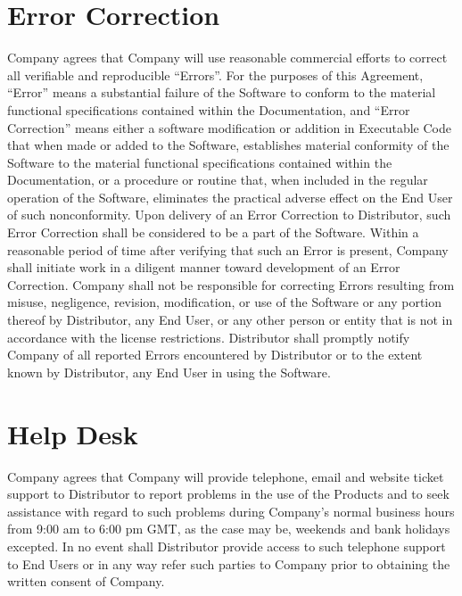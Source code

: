 \documentclass[letterpaper,10pt,english]{sphinxmanual}
\begin{document}
\section{Error Correction}
\label{\detokenize{maintenanceservice:error-correction}}
Company agrees that Company will use reasonable commercial efforts to correct all verifiable and reproducible “Errors”. For the purposes of this Agreement, “Error” means a substantial failure of the Software to conform to the material functional specifications contained within the Documentation, and “Error Correction” means either a software modification or addition in Executable Code that when made or added to the Software, establishes material conformity of the Software to the material functional specifications contained within the Documentation, or a procedure or routine that, when included in the regular operation of the Software, eliminates the practical adverse effect on the End User of such nonconformity. Upon delivery of an Error Correction to Distributor, such Error Correction shall be considered to be a part of the Software. Within a reasonable period of time after verifying that such an Error is present, Company shall initiate work in a diligent manner toward development of an Error Correction. Company shall not be responsible for correcting Errors resulting from misuse, negligence, revision, modification, or use of the Software or any portion thereof by Distributor, any End User, or any other person or entity that is not in accordance with the license restrictions.  Distributor shall promptly notify Company of all reported Errors encountered by Distributor or to the extent known by Distributor, any End User in using the Software.


\section{Help Desk}
\label{\detokenize{maintenanceservice:help-desk}}
Company agrees that Company will provide telephone, email and website ticket support to Distributor to report problems in the use of the Products and to seek assistance with regard to such problems during Company’s normal business hours from 9:00 am to 6:00 pm GMT, as the case may be, weekends and bank holidays excepted. In no event shall Distributor provide access to such telephone support to End Users or in any way refer such parties to Company prior to obtaining the written consent of Company.
\end{document}
